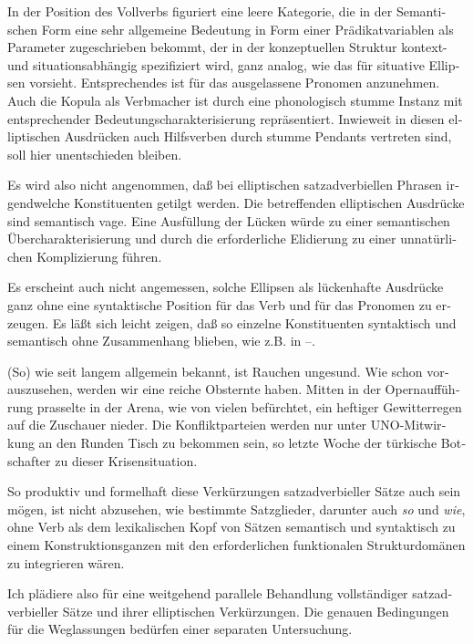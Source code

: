 \documentclass[output=paper, colorlinks, citecolor=brown, booklanguage=german]{langscibook}
\begin{document}
\begin{otherlanguage}{german}
In der Position des Vollverbs figuriert eine leere Kategorie, die in der Semantischen Form eine sehr allgemeine Bedeutung in Form einer Prädikatvariablen als Parameter zugeschrieben bekommt, der in der konzeptuellen Struktur kontext- und situationsabhängig spezifiziert wird, ganz analog, wie \citet{1994syntax-und-semantik-situativer-ellipsen} das für situative Ellipsen vorsieht. Entsprechendes ist für das ausgelassene Pronomen anzunehmen. Auch die Kopula als Verbmacher ist durch eine phonologisch stumme Instanz mit entsprechender Bedeutungscharakterisierung repräsentiert. Inwieweit in diesen elliptischen Ausdrücken auch Hilfsverben durch stumme Pendants vertreten sind, soll hier unentschieden bleiben.

Es wird also nicht angenommen, daß bei elliptischen satzadverbiellen Phrasen irgendwelche Konstituenten getilgt werden. Die betreffenden elliptischen Ausdrücke sind semantisch vage. Eine Ausfüllung der Lücken würde zu einer semantischen Übercharakterisierung und durch die erforderliche Elidierung zu einer unnatürlichen Komplizierung führen.

Es erscheint auch nicht angemessen, solche Ellipsen als lückenhafte Ausdrücke ganz ohne eine syntaktische Position für das Verb und für das Pronomen zu erzeugen. Es läßt sich leicht zeigen, daß so einzelne Konstituenten syntaktisch und semantisch ohne Zusammenhang blieben, wie z.B. in --.

\ea (So) wie seit langem allgemein bekannt, ist Rauchen ungesund. \label{ex:zi97:30}
\ex Wie schon vorauszusehen, werden wir eine reiche Obsternte haben. \label{ex:zi97:31}
\ex Mitten in der Opernaufführung prasselte in der Arena, wie von vielen befürchtet, ein heftiger Gewitterregen auf die Zuschauer nieder. \label{ex:zi97:32}
\ex Die Konfliktparteien werden nur unter UNO-Mitwirkung an den Runden Tisch zu bekommen sein, so letzte Woche der türkische Botschafter zu dieser Krisensituation. \label{ex:zi97:33}
\z

\noindent So produktiv und formelhaft diese Verkürzungen satzadverbieller Sätze auch sein mögen, ist nicht abzusehen, wie bestimmte Satzglieder, darunter auch \textit{so} und \textit{wie}, ohne Verb als dem lexikalischen Kopf von Sätzen semantisch und syntaktisch zu einem Konstruktionsganzen mit den erforderlichen funktionalen Strukturdomänen zu integrieren wären.

Ich plädiere also für eine weitgehend parallele Behandlung vollständiger satzadverbieller Sätze und ihrer elliptischen Verkürzungen. Die genauen Bedingungen für die Weglassungen bedürfen einer separaten Untersuchung.


\end{otherlanguage}
\end{document}
